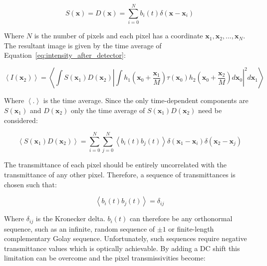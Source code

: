 \begin{equation}\label{eq:detector_aperture_time}
S\left(\textbf{x}\right) = D\left(\textbf{x}\right) = \sum_{i=0}^{N} b_{i}\left(t\right)\delta\left(\textbf{x} - \textbf{x}_{i}\right)
\end{equation}

Where $N$ is the number of pixels and each pixel has a 
coordinate $\textbf{x}_{1}, \textbf{x}_{2},...,\textbf{x}_{N}$. 
The resultant image is given by the time average of 
Equation~\ref{eq:intensity_after_detector}:

\begin{equation}\label{eq:confocal_image_time_ave}
\left\langle I\left(\textbf{x}_{2}\right)\right\rangle = \left\langle \int S\left(\textbf{x}_{1}\right) D\left(\textbf{x}_{2}\right) \left| \int h_{1}\left(\textbf{x}_{0} + \frac{\textbf{x}_{1}}{M}\right) \tau\left(\textbf{x}_{0}\right) h_{2}\left(\textbf{x}_{0} + \frac{\textbf{x}_{2}}{M}\right)d\textbf{x}_{0}\right|^{2}d\textbf{x}_{1}\right\rangle
\end{equation}

Where $\left\langle . \right\rangle$ is the time average. 
Since the only time-dependent components are 
$S\left(\textbf{x}_{1}\right)$ and $D\left(\textbf{x}_{2}\right)$ 
only the time average of 
$S\left(\textbf{x}_{1}\right) D\left(\textbf{x}_{2}\right)$ 
need be considered:

\begin{equation}\label{eq:SD_time_ave}
\left\langle S\left(\textbf{x}_{1}\right) D\left(\textbf{x}_{2}\right)\right\rangle = \sum_{i=0}^{N}\sum_{j=0}^{N} \left\langle b_{i}\left(t\right) b_{j}\left(t\right)\right\rangle \delta\left(\textbf{x}_{1} - \textbf{x}_{i}\right) \delta\left(\textbf{x}_{2} - \textbf{x}_{j}\right)
\end{equation}

The transmittance of each pixel should be entirely 
uncorrelated with the transmittance of any other pixel. 
Therefore, a sequence of transmittances is chosen such that:

\begin{equation}\label{eq:pixel_uncorrelation}
\left\langle b_{i}\left(t\right) b_{j}\left(t\right)\right\rangle = \delta_{ij}
\end{equation}

Where $\delta_{ij}$ is the Kronecker delta. $b_{i}\left(t\right)$ 
can therefore be any orthonormal sequence, such as an infinite, 
random sequence of $\pm1$ or finite-length complementary Golay 
sequence.\cite{golay1949multi} Unfortunately, such sequences 
require negative transmittance values which is optically 
achievable. By adding a DC shift this limitation can be overcome 
and the pixel transmissivities become:

